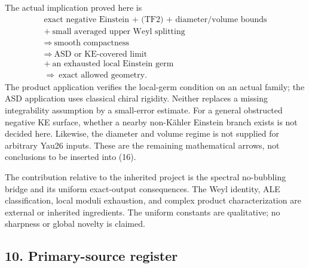 \documentclass[
  11pt,
]{article}
\begin{document}
The actual implication proved here is \[
 \begin{gathered}
 \text{exact negative Einstein + (TF2) + diameter/volume bounds}\\
 +\ \text{small averaged upper Weyl splitting}\\
 \Longrightarrow\ \text{smooth compactness}\\
 \Longrightarrow\ \text{ASD or KE-covered limit}\\
 +\ \text{an exhausted local Einstein germ}\\
 \Longrightarrow\ \text{exact allowed geometry}.
 \end{gathered}                                             \tag{16}
\] The product application verifies the local-germ condition on an
actual family; the ASD application uses classical chiral rigidity.
Neither replaces a missing integrability assumption by a small-error
estimate. For a general obstructed negative KE surface, whether a nearby
non-Kähler Einstein branch exists is not decided here. Likewise, the
diameter and volume regime is not supplied for arbitrary Yau26 inputs.
These are the remaining mathematical arrows, not conclusions to be
inserted into (16).

The contribution relative to the inherited project is the spectral
no-bubbling bridge and its uniform exact-output consequences. The Weyl
identity, ALE classification, local moduli exhaustion, and complex
product characterization are external or inherited ingredients. The
uniform constants are qualitative; no sharpness or global novelty is
claimed.

\hypertarget{primary-source-register}{%
\subsection{10. Primary-source register}\label{primary-source-register}}
\end{document}
